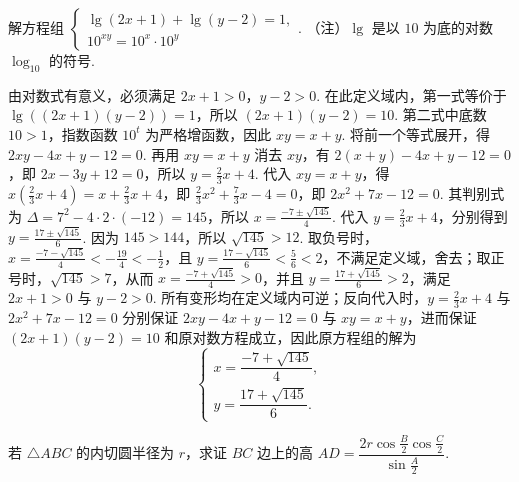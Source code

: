 \documentclass[UTF8,a4paper,oneside,11pt]{ctexbook}
\begin{document}
\begin{problem}
解方程组 \(\begin{cases}
\lg(2x+1)+\lg(y-2)=1,\\
10^{xy}=10^{x}\cdot10^{y}
\end{cases}\). （注）\(\lg\) 是以 \(10\) 为底的对数 \(\log_{10}\) 的符号.
\end{problem}

\begin{solution}
由对数式有意义，必须满足 \(2x+1>0\)，\(y-2>0\). 在此定义域内，第一式等价于 \(\lg\left((2x+1)(y-2)\right)=1\)，所以 \((2x+1)(y-2)=10\). 第二式中底数 \(10>1\)，指数函数 \(10^t\) 为严格增函数，因此 \(xy=x+y\). 将前一个等式展开，得 \(2xy-4x+y-12=0\). 再用 \(xy=x+y\) 消去 \(xy\)，有 \(2(x+y)-4x+y-12=0\)，即 \(2x-3y+12=0\)，所以 \(y=\frac{2}{3}x+4\).
代入 \(xy=x+y\)，得 \(x\left(\frac{2}{3}x+4\right)=x+\frac{2}{3}x+4\)，即 \(\frac{2}{3}x^2+\frac{7}{3}x-4=0\)，即 \(2x^2+7x-12=0\). 其判别式为 \(\Delta=7^2-4\cdot2\cdot(-12)=145\)，所以 \(x=\frac{-7\pm\sqrt{145}}{4}\). 代入 \(y=\frac{2}{3}x+4\)，分别得到 \(y=\frac{17\pm\sqrt{145}}{6}\).
因为 \(145>144\)，所以 \(\sqrt{145}>12\). 取负号时，\(x=\frac{-7-\sqrt{145}}{4}<-\frac{19}{4}<-\frac12\)，且 \(y=\frac{17-\sqrt{145}}{6}<\frac{5}{6}<2\)，不满足定义域，舍去；取正号时，\(\sqrt{145}>7\)，从而 \(x=\frac{-7+\sqrt{145}}{4}>0\)，并且 \(y=\frac{17+\sqrt{145}}{6}>2\)，满足 \(2x+1>0\) 与 \(y-2>0\). 所有变形均在定义域内可逆；反向代入时，\(y=\frac{2}{3}x+4\) 与 \(2x^2+7x-12=0\) 分别保证 \(2xy-4x+y-12=0\) 与 \(xy=x+y\)，进而保证 \((2x+1)(y-2)=10\) 和原对数方程成立，因此原方程组的解为
\[
\begin{cases}
x=\dfrac{-7+\sqrt{145}}{4},\\
y=\dfrac{17+\sqrt{145}}{6}.
\end{cases}
\]
\end{solution}

\begin{problem}
若 \(\triangle ABC\) 的内切圆半径为 \(r\)，求证 \(BC\) 边上的高 \(AD=\dfrac{2r\cos\frac{B}{2}\cos\frac{C}{2}}{\sin\frac{A}{2}}\).
\end{problem}
\end{document}
